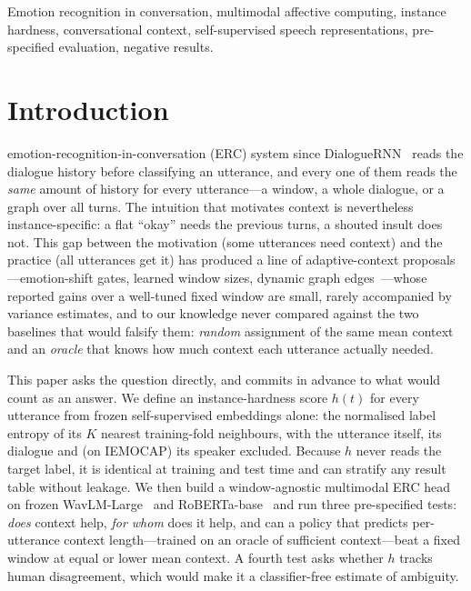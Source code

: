 \documentclass[journal]{IEEEtran}
\begin{document}
\begin{IEEEkeywords}
Emotion recognition in conversation, multimodal affective computing, instance hardness, conversational context, self-supervised speech representations, pre-specified evaluation, negative results.
\end{IEEEkeywords}

\IEEEpeerreviewmaketitle

\section{Introduction}
 emotion-recognition-in-conversation (ERC) system since DialogueRNN~\cite{majumder2019dialoguernn} reads the dialogue history before classifying an utterance, and every one of them reads the \emph{same} amount of history for every utterance---a window, a whole dialogue, or a graph over all turns. The intuition that motivates context is nevertheless instance-specific: a flat ``okay'' needs the previous turns, a shouted insult does not. This gap between the motivation (some utterances need context) and the practice (all utterances get it) has produced a line of adaptive-context proposals---emotion-shift gates, learned window sizes, dynamic graph edges~\cite{bansal2022shapes}---whose reported gains over a well-tuned fixed window are small, rarely accompanied by variance estimates, and to our knowledge never compared against the two baselines that would falsify them: \emph{random} assignment of the same mean context and an \emph{oracle} that knows how much context each utterance actually needed.

This paper asks the question directly, and commits in advance to what would count as an answer. We define an instance-hardness score $h(t)$ for every utterance from frozen self-supervised embeddings alone: the normalised label entropy of its $K$ nearest training-fold neighbours, with the utterance itself, its dialogue and (on IEMOCAP) its speaker excluded. Because $h$ never reads the target label, it is identical at training and test time and can stratify any result table without leakage. We then build a window-agnostic multimodal ERC head on frozen WavLM-Large~\cite{chen2022wavlm} and RoBERTa-base~\cite{liu2019roberta} and run three pre-specified tests: \emph{does} context help, \emph{for whom} does it help, and can a policy that predicts per-utterance context length---trained on an oracle of sufficient context---beat a fixed window at equal or lower mean context. A fourth test asks whether $h$ tracks human disagreement, which would make it a classifier-free estimate of ambiguity.
\end{document}
